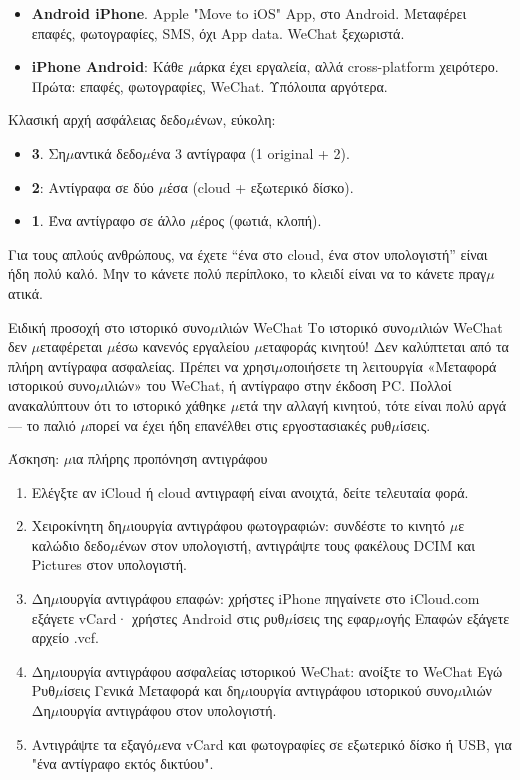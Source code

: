 \begin{itemize}
  \item \textbf{Android iPhone}. Apple "Move to iOS" App, στο Android. Μεταφέρει επαφές, φωτογραφίες, SMS, όχι App data. WeChat ξεχωριστά.
  \item \textbf{iPhone Android}: Κάθε $\mu$άρκα έχει εργαλεία, αλλά cross-platform χειρότερο. Πρώτα: επαφές, φωτογραφίες, WeChat. Υπόλοιπα αργότερα.
\end{itemize}


Κλασική αρχή ασφάλειας δεδο$\mu$ένων, εύκολη:

\begin{itemize}
  \item \textbf{3}. Ση$\mu$αντικά δεδο$\mu$ένα 3 αντίγραφα (1 original + 2).
  \item \textbf{2}: Αντίγραφα σε δύο $\mu$έσα (cloud + εξωτερικό δίσκο).
  \item \textbf{1}. Ένα αντίγραφο σε άλλο $\mu$έρος (φωτιά, κλοπή).
\end{itemize}

Για τους απλούς ανθρώπους, να έχετε “ένα στο cloud, ένα στον υπολογιστή” είναι ήδη πολύ καλό. Μην το κάνετε πολύ περίπλοκο, το κλειδί είναι να το κάνετε πραγ$\mu$ατικά.

\begin{tcbwarn}{Ειδική προσοχή στο ιστορικό συνο$\mu$ιλιών WeChat}
Το ιστορικό συνο$\mu$ιλιών WeChat δεν $\mu$εταφέρεται $\mu$έσω κανενός εργαλείου $\mu$εταφοράς κινητού! Δεν καλύπτεται από τα πλήρη αντίγραφα ασφαλείας. Πρέπει να χρησι$\mu$οποιήσετε τη λειτουργία «Μεταφορά ιστορικού συνο$\mu$ιλιών» του WeChat, ή αντίγραφο στην έκδοση PC. Πολλοί ανακαλύπτουν ότι το ιστορικό χάθηκε $\mu$ετά την αλλαγή κινητού, τότε είναι πολύ αργά — το παλιό $\mu$πορεί να έχει ήδη επανέλθει στις εργοστασιακές ρυθ$\mu$ίσεις.

\end{tcbwarn}

\begin{tcbpractice}{Άσκηση: $\mu$ια πλήρης προπόνηση αντιγράφου}
\begin{enumerate}
  \item Ελέγξτε αν iCloud ή cloud αντιγραφή είναι ανοιχτά, δείτε τελευταία φορά.
  \item Χειροκίνητη δη$\mu$ιουργία αντιγράφου φωτογραφιών: συνδέστε το κινητό $\mu$ε καλώδιο δεδο$\mu$ένων στον υπολογιστή, αντιγράψτε τους φακέλους DCIM και Pictures στον υπολογιστή.
  \item Δη$\mu$ιουργία αντιγράφου επαφών: χρήστες iPhone πηγαίνετε στο iCloud.com εξάγετε vCard· χρήστες Android στις ρυθ$\mu$ίσεις της εφαρ$\mu$ογής Επαφών εξάγετε αρχείο .vcf.
  \item Δη$\mu$ιουργία αντιγράφου ασφαλείας ιστορικού WeChat: ανοίξτε το WeChat Εγώ Ρυθ$\mu$ίσεις Γενικά Μεταφορά και δη$\mu$ιουργία αντιγράφου ιστορικού συνο$\mu$ιλιών Δη$\mu$ιουργία αντιγράφου στον υπολογιστή.
  \item Αντιγράψτε τα εξαγό$\mu$ενα vCard και φωτογραφίες σε εξωτερικό δίσκο ή USB, για "ένα αντίγραφο εκτός δικτύου".
\end{enumerate}

\end{tcbpractice}
